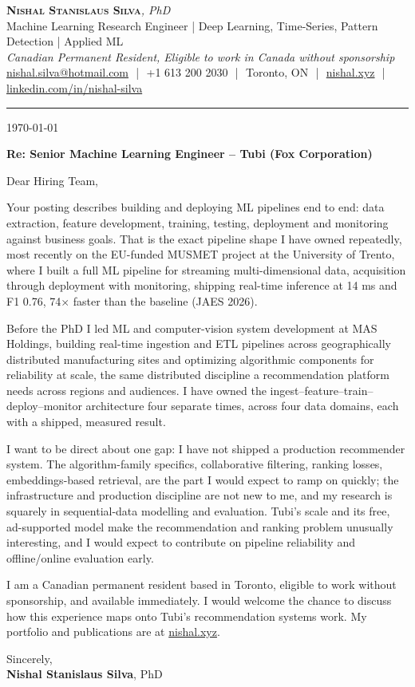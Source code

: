 \documentclass[11pt]{article}
\newcommand{\clName}{Nishal Stanislaus Silva}
\newcommand{\clStatus}{Canadian Permanent Resident, Eligible to work in Canada without sponsorship}
\newcommand{\clTagline}{Machine Learning Research Engineer | Deep Learning, Time-Series, Pattern Detection | Applied ML}
\newcommand{\clRole}{Senior Machine Learning Engineer}
\newcommand{\clCompany}{Tubi}
\begin{document}
\pagestyle{empty}
\begin{center}
    {\LARGE \scshape \textbf{\clName}}{\large \textit{, PhD}}
    \\[1pt]
    {\small \clTagline}
    \\[1pt]
    {\footnotesize\textit{\clStatus}}
    \\[1pt]
    {\small
    \href{mailto:nishal.silva@hotmail.com}{nishal.silva@hotmail.com}
    \,\,|\,\, +1 613 200 2030
    \,\,|\,\, Toronto, ON
    \,\,|\,\, \href{https://nishal.xyz}{nishal.xyz}
    \,\,|\,\, \href{https://www.linkedin.com/in/nishal-silva}{linkedin.com/in/nishal-silva}}
\end{center}

\rule{\linewidth}{0.4pt}\vspace{0.6em}

\today

\textbf{Re: \clRole{} -- \clCompany{} (Fox Corporation)}

Dear Hiring Team,

Your posting describes building and deploying ML pipelines end to end: data extraction, feature development, training, testing, deployment and monitoring against business goals. That is the exact pipeline shape I have owned repeatedly, most recently on the EU-funded MUSMET project at the University of Trento, where I built a full ML pipeline for streaming multi-dimensional data, acquisition through deployment with monitoring, shipping real-time inference at 14 ms and F1 0.76, 74$\times$ faster than the baseline (JAES 2026).

Before the PhD I led ML and computer-vision system development at MAS Holdings, building real-time ingestion and ETL pipelines across geographically distributed manufacturing sites and optimizing algorithmic components for reliability at scale, the same distributed discipline a recommendation platform needs across regions and audiences. I have owned the ingest--feature--train--deploy--monitor architecture four separate times, across four data domains, each with a shipped, measured result.

I want to be direct about one gap: I have not shipped a production recommender system. The algorithm-family specifics, collaborative filtering, ranking losses, embeddings-based retrieval, are the part I would expect to ramp on quickly; the infrastructure and production discipline are not new to me, and my research is squarely in sequential-data modelling and evaluation. Tubi's scale and its free, ad-supported model make the recommendation and ranking problem unusually interesting, and I would expect to contribute on pipeline reliability and offline/online evaluation early.

I am a Canadian permanent resident based in Toronto, eligible to work without sponsorship, and available immediately. I would welcome the chance to discuss how this experience maps onto Tubi's recommendation systems work. My portfolio and publications are at \href{https://nishal.xyz}{nishal.xyz}.

\vspace{12pt}
Sincerely,\\[2pt]
\textbf{\clName}, PhD
\end{document}
